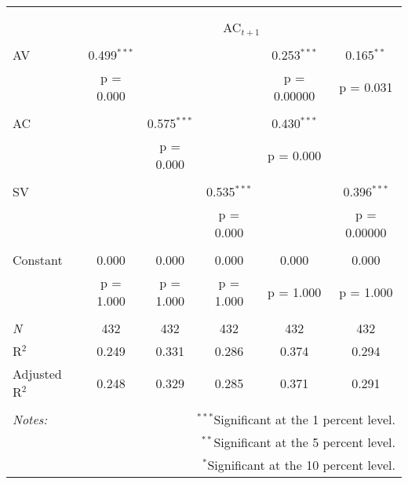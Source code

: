 
\begin{tabular}{@{\extracolsep{5pt}}lccccc} 
\\[-1.8ex]\hline 
\hline \\[-1.8ex] 
\\[-1.8ex] & \multicolumn{5}{c}{AC$_{t+1}$} \\ 
\hline \\[-1.8ex] 
 AV & 0.499$^{***}$ &  &  & 0.253$^{***}$ & 0.165$^{**}$ \\ 
  & p = 0.000 &  &  & p = 0.00000 & p = 0.031 \\ 
  & & & & & \\ 
 AC &  & 0.575$^{***}$ &  & 0.430$^{***}$ &  \\ 
  &  & p = 0.000 &  & p = 0.000 &  \\ 
  & & & & & \\ 
 SV &  &  & 0.535$^{***}$ &  & 0.396$^{***}$ \\ 
  &  &  & p = 0.000 &  & p = 0.00000 \\ 
  & & & & & \\ 
 Constant & 0.000 & 0.000 & 0.000 & 0.000 & 0.000 \\ 
  & p = 1.000 & p = 1.000 & p = 1.000 & p = 1.000 & p = 1.000 \\ 
  & & & & & \\ 
\textit{N} & 432 & 432 & 432 & 432 & 432 \\ 
R$^{2}$ & 0.249 & 0.331 & 0.286 & 0.374 & 0.294 \\ 
Adjusted R$^{2}$ & 0.248 & 0.329 & 0.285 & 0.371 & 0.291 \\ 
\hline 
\hline \\[-1.8ex] 
\textit{Notes:} & \multicolumn{5}{r}{$^{***}$Significant at the 1 percent level.} \\ 
 & \multicolumn{5}{r}{$^{**}$Significant at the 5 percent level.} \\ 
 & \multicolumn{5}{r}{$^{*}$Significant at the 10 percent level.} \\ 
\end{tabular} 

